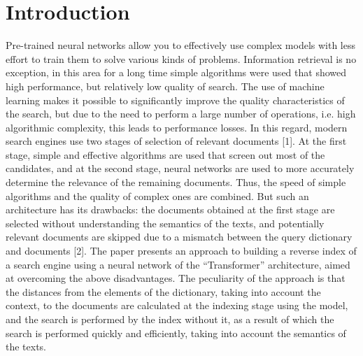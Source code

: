 \documentclass[
    twocolumn,
]{template/ceurart}
\begin{document}
    \section{Introduction}
    Pre-trained neural networks allow you to effectively use complex models with less effort
    to train them to solve various kinds of problems.
    Information retrieval is no exception, in this area for a long time simple algorithms
    were used that showed high performance, but relatively low quality of search.
    The use of machine learning makes it possible to significantly improve the quality
    characteristics of the search, but due to the need to perform a large number of operations,
    i.e. high algorithmic complexity, this leads to performance losses.
    In this regard, modern search engines use two stages of selection of relevant documents [1].
    At the first stage, simple and effective algorithms are used that screen out most of the candidates,
    and at the second stage, neural networks are used to more accurately determine
    the relevance of the remaining documents.
    Thus, the speed of simple algorithms and the quality of complex ones are combined.
    But such an architecture has its drawbacks: the documents obtained at the first stage are selected
    without understanding the semantics of the texts, and potentially relevant documents are skipped
    due to a mismatch between the query dictionary and documents [2].
    The paper presents an approach to building a reverse index of a search engine using a neural network
    of the ``Transformer'' architecture, aimed at overcoming the above disadvantages.
    The peculiarity of the approach is that the distances from the elements of the dictionary,
    taking into account the context, to the documents are calculated at the indexing stage using the model,
    and the search is performed by the index without it, as a result of which the search is performed quickly
    and efficiently, taking into account the semantics of the texts.
\end{document}
